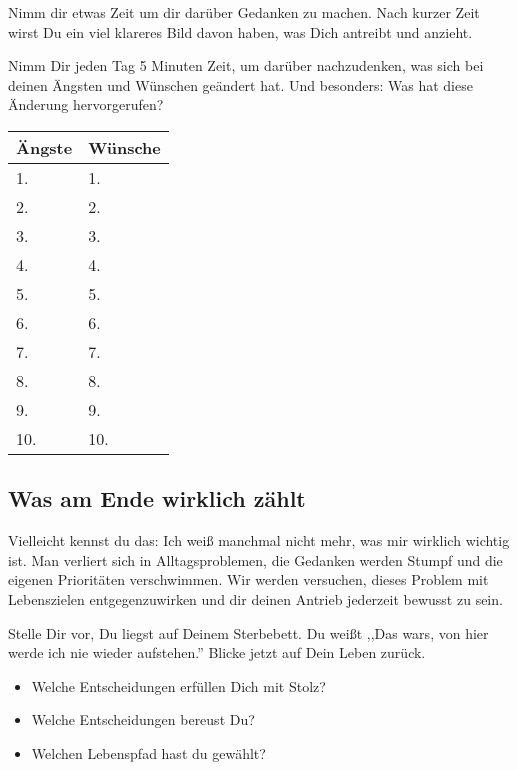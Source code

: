 \documentclass[../Lebensziel.tex]{subfiles}
\begin{document}
Nimm dir etwas Zeit um dir darüber Gedanken zu machen. Nach kurzer Zeit wirst Du ein viel klareres Bild davon haben, was Dich antreibt und anzieht.

Nimm Dir jeden Tag 5 Minuten Zeit, um darüber nachzudenken, was sich bei deinen Ängsten und Wünschen geändert hat. Und besonders: Was hat diese Änderung hervorgerufen?

\begin{table}[h!]
    \centering
    \setlength{\tabcolsep}{18pt}
    \renewcommand{\arraystretch}{1.5}
    \begin{tabular}{p{5.5cm}|p{5.5cm}}
        \textbf{Ängste} & \textbf{Wünsche} \\\hline
        1.              & 1.               \\\hline
        2.              & 2.               \\\hline
        3.              & 3.               \\\hline
        4.              & 4.               \\\hline
        5.              & 5.               \\\hline
        6.              & 6.               \\\hline
        7.              & 7.               \\\hline
        8.              & 8.               \\\hline
        9.              & 9.               \\\hline
        10.             & 10.
    \end{tabular}
    \label{angst+wunsch}
\end{table}

\newpage
\subsection*{Was am Ende wirklich zählt}
Vielleicht kennst du das: Ich weiß manchmal nicht mehr, was mir wirklich wichtig ist. Man verliert sich in Alltagsproblemen, die Gedanken werden Stumpf und die eigenen Prioritäten verschwimmen. Wir werden versuchen, dieses Problem mit Lebenszielen entgegenzuwirken und dir deinen Antrieb jederzeit bewusst zu sein.

Stelle Dir vor, Du liegst auf Deinem Sterbebett. Du weißt ,,Das wars, von hier werde ich nie wieder aufstehen.''
Blicke jetzt auf Dein Leben zurück.
\begin{itemize}
    \item Welche Entscheidungen erfüllen Dich mit Stolz?
    \item Welche Entscheidungen bereust Du?
    \item Welchen Lebenspfad hast du gewählt?
\end{itemize}
\end{document}
